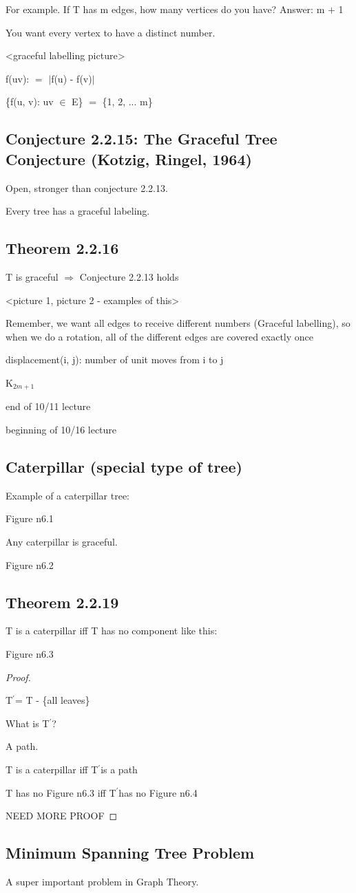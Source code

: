 \documentclass{article}
\newcommand{\mt}[1]{\ensuremath{#1}}
\newcommand\ssc[2][\DefaultOpt]{%
  \def\DefaultOpt{#2}%
  \subsection[#1]{#2}%
}
\newcommand{\bgpf}{\begin{proof} $ $\newline}
\newcommand{\epf}{\end{proof}}
\newcommand{\mem}{\mt{\in} }
\newcommand{\rar}{ \mt{\Rightarrow} }     %
\newcommand{\av}[1]{\mt{|}#1\mt{|}}  %
\newcommand{\bk}[1]{\{#1\}}
\newcommand{\ps}{\mt{\operatorname{+}} }
\newcommand{\ms}{\mt{\operatorname{-}} }
\newcommand{\eql}{ \mt{\operatorname{=}} }
\newcommand{\pr}{\mt{^\prime}} 		   %
\newcommand{\uw}[2]{#1\mt{_{#2}}}
\begin{document}
{For example. If T has m edges, how many vertices do you have? Answer: m \ps 1

You want every vertex to have a distinct number.

<graceful labelling picture>

f(uv): \eql \av{f(u) \ms f(v)}

\bk{f(u, v): uv \mem E} \eql \bk{1, 2, ... m}

\ssc{Conjecture 2.2.15: The Graceful Tree Conjecture (Kotzig, Ringel, 1964)}{
Open, stronger than conjecture 2.2.13.

Every tree has a graceful labeling. 

}

\ssc{Theorem 2.2.16}{
T is graceful \rar Conjecture 2.2.13 holds

<picture 1, picture 2 - examples of this>

Remember, we want all edges to receive different numbers (Graceful labelling), so when we do a rotation, all of the different edges are covered exactly once

displacement(i, j): number of unit moves from i to j

\uw{K}{2m + 1} 
}

end of 10/11 lecture

beginning of 10/16 lecture

\ssc{Caterpillar (special type of tree)}{

Example of a caterpillar tree:

Figure n6.1

Any caterpillar is graceful.

Figure n6.2

}

\ssc{Theorem 2.2.19}{

T is a caterpillar iff T has no component like this:

Figure n6.3

\bgpf

T\pr = T \ms \bk{all leaves}

What is T\pr?

A path.

T is a caterpillar iff T\pr is a path

T has no Figure n6.3 iff T\pr has no Figure n6.4

NEED MORE PROOF

\epf

}

\ssc{Minimum Spanning Tree Problem}{

A super important problem in Graph Theory.

}}
\end{document}
